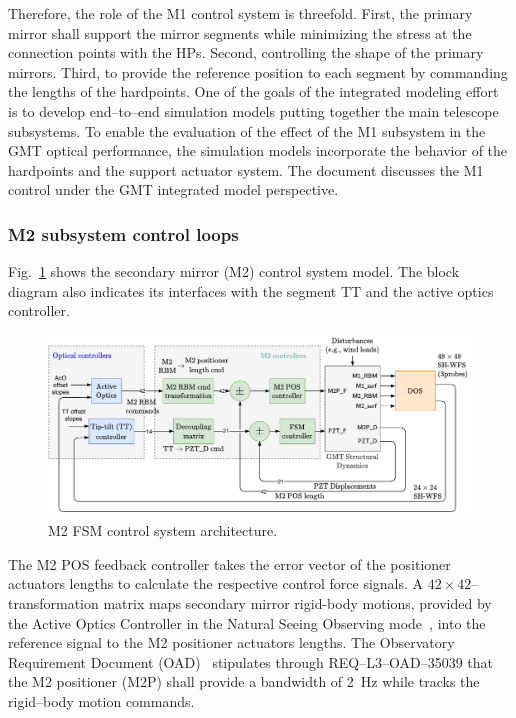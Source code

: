 \documentclass{gmto}
\begin{document}
Therefore, the role of the M1 control system is threefold. First, the primary mirror shall support the mirror segments while minimizing the stress at the connection points with the HPs. Second, controlling the shape of the primary mirrors. Third, to provide the reference position to each segment by commanding the lengths of the hardpoints. One of the goals of the integrated modeling effort is to develop end--to--end simulation models putting together the main telescope subsystems. To enable the evaluation of the effect of the M1 subsystem in the GMT optical performance, the simulation models incorporate the behavior of the hardpoints and the support actuator system. The document \cite{GMT.DOC.05153} discusses the M1 control under the GMT integrated model perspective.



\subsubsection{M2 subsystem control loops}
\label{sec:m2-ctrl}

Fig.~\ref{fig:fsm_control_arch} shows the secondary mirror (M2) control system model. The block diagram also indicates its interfaces with the segment TT and the active optics controller. %
%
\begin{figure}[!hbt]
    \vspace{6pt}
    \centering
    \includegraphics[width=\textwidth]{WFC-FSM_control_intf.pdf}
    \caption{M2 FSM control system architecture.}
    \label{fig:fsm_control_arch}
\end{figure}
%
The M2 POS feedback controller takes the error vector of the positioner actuators lengths to calculate the respective control force signals. A $42 \times 42$--transformation matrix maps secondary mirror rigid-body motions, provided by the Active Optics Controller in the Natural Seeing Observing mode~\cite{GMTO.NS.Alg.DOC}, into the reference signal to the M2 positioner actuators lengths. The Observatory Requirement Document (OAD)~\cite{OAD}  stipulates through REQ--L3--OAD--35039 that the M2 positioner (M2P) shall provide a bandwidth of \SI{2}{Hz} while tracks the rigid--body motion commands.
\end{document}
